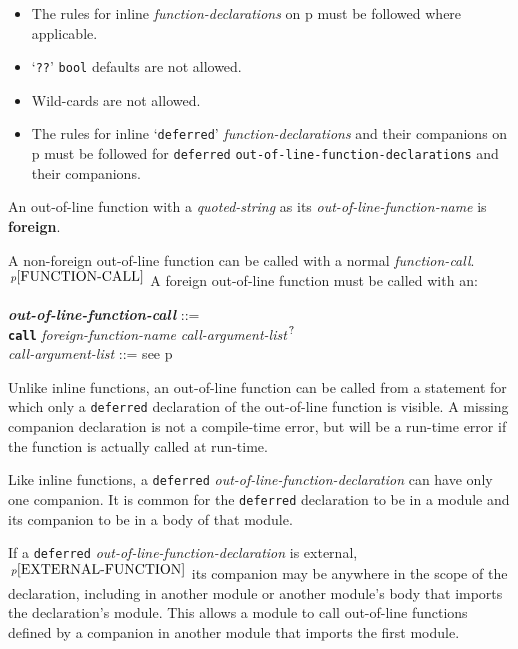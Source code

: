 \documentclass[12pt]{article}
\newcommand{\QMARK}{{$^{\,\mbox{\footnotesize ?}}$}}
\newcommand{\key}[1]{{\rm \bfseries #1}}
\newcommand{\ttkey}[1]{{\tt \bfseries #1}}
\newcommand{\emkey}[1]{{\em \bfseries #1}}
\newcommand{\pagref}[1]{p\pageref{#1}}
\newcommand{\pagnote}[1]{$\,^{p\pageref{#1}}$}
\newenvironment{indpar}[1][0.3in]%
	{\begin{list}{}%
		     {\setlength{\itemsep}{0in}%
		      \setlength{\topsep}{0in}%
		      \setlength{\parsep}{1ex}%
		      \setlength{\labelwidth}{#1}%
		      \setlength{\leftmargin}{#1}%
		      \addtolength{\leftmargin}{\labelsep}}%
	 \item}%
	{\end{list}}
\begin{document}
\begin{indpar}
\begin{itemize}
\item
The rules for inline {\em function-declarations} on
\pagref{FUNCTION-DECLARATION} must be followed where applicable.
\item
`{\tt ??}' {\tt bool} defaults are not allowed.
\item
Wild-cards are not allowed.
\item
The rules for inline `{\tt deferred}' {\em function-declarations} and
their companions on \pagref{COMPANION-DECLARATION}
must be followed for {\tt deferred} {\tt out-of-line-function-declarations}
and their companions.
\end{itemize}
\end{indpar}

An out-of-line function with a {\em quoted-string} as its
{\em out-of-line-function-name} is \key{foreign}.

A non-foreign out-of-line function can be called with a normal
{\em function-call}.\pagnote{FUNCTION-CALL}  A foreign
out-of-line function must be called with an:
\begin{indpar}
\emkey{out-of-line-function-call}%
	\label{OUT-OF-LINE-FUNCTION-CALL} ::= \\
\hspace*{0.25in}
	\ttkey{call} {\em foreign-function-name}
	     {\em call-argument-list}\QMARK{}
\\[0.5ex]
{\em call-argument-list} ::= see \pagref{CALL-ARGUMENT-LIST}
\end{indpar}

Unlike inline functions, an out-of-line function can
be called from a statement for which only a {\tt deferred} declaration
of the out-of-line function is visible.  A missing companion
declaration is not a compile-time error, but will be a
run-time error if the function is actually called at run-time.

Like inline functions, a {\tt deferred} {\em out-of-line-function-declaration}
can have only one companion.  It is common for the {\tt deferred}
declaration to be in a module and its companion to be in a body of
that module.

If\label{OUT-OF-LINE-EXTERNAL-COMPANION}
a {\tt deferred} {\em out-of-line-function-declaration}
is external,\pagnote{EXTERNAL-FUNCTION}
its companion may be anywhere in the scope of the declaration,
including in another module or another module's body that imports
the declaration's module.
This allows a module to call out-of-line functions defined by
a companion in another module that imports the first module.
\end{document}
